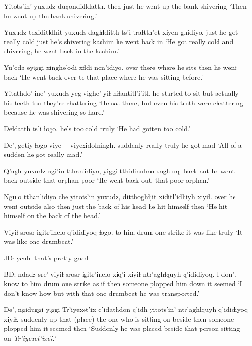 \documentclass[12pt]{article}
\begin{document}
\gll Yitots'in' yuxudz duqondidldatth.
then       just   {he went up the bank shivering}
\glt `Then he went up the bank shivering.'
\glend

\gll Yuxudz toxiditldhit       yuxudz daghɬditth ts'i traɬtth'et xiyen-ghidiyo. 
just   {he got really cold} just   {he's shivering} {} kashim     {he went back in}
\glt `He got really cold and shivering, he went back in the kashim.'
\glend

\gll Yu'odz eyiggi xinghe'odi    xiɬdi non'idiyo.
over   there  {where he sits} then  {he went back}
\glt `He went back over to that place where he was sitting before.'
\glend

\gll Yitathdo'         ine' {yuxudz yeg} vighe'    yiɬ niɬantitl'i'itl.
{he started to sit} but actually          {his teeth} too {they're chattering}
\glt `He sat there, but even his teeth were chattering because he was shivering so hard.'
\glend

\gll Deɬdatth ts'i ɬogo. 
{he's too cold} {} truly
\glt `He had gotten too cold.'
\glend

\gll De',  getiy  ɬogo viye--- viyexidolningh. 
suddenly really truly {} {he got mad}
\glt `All of a sudden he got really mad.'
\glend

\gll Q'agh yuxudz {ngi'in tthan'idiyo,}  yiggi tthidinuhon soghluq.
back  out    {he went back outside} that  orphan poor
\glt `He went back out, that poor orphan.'
\glend

\gll Ngu'o tthan'idiyo     che  yitots'in yuxudz, ditthoghɬjit xiditl'idhiyh xiyiɬ.
over  {he went outside} also then      just  {the back of his head} {he hit himself} then
\glt `He hit himself on the back of the head.'
\glend

\gll Viyiɬ srosr igitr'inelo q'ididiyoq ɬogo.
{to him}  drum  {one strike} {it was like} truly
\glt `It was like one drumbeat.'
\glend

JD:  yeah. that's pretty good

BD:  
 {ndadz sre'}       viyiɬ  srosr igitr'inelo xiq'i xiyiɬ ntr'aghɬquyh           q'ididiyoq.
{}         {I don't know} {to him} drum  {one strike}  {as if} then {someone plopped him down} {it seemed}
\glt `I don't know how but with that one drumbeat he was transported.'
\glend

\gll De', ngiduggi yiggi Tr'iyexet'ix q'idathdon q'idh  yitots'in' ntr'aghɬquyh          q'ididiyoq xiyiɬ.
suddenly   up     that  (place) {the one who is sitting on} beside then  {someone plopped him} {it seemed} then
\glt `Suddenly he was placed beside that person sitting on \em Tr'iyexet'ixdi.'
\glend
\end{document}
